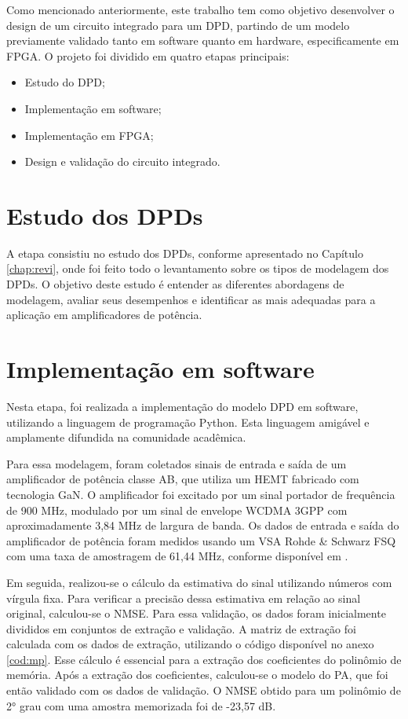 Como mencionado anteriormente, este trabalho tem como objetivo desenvolver o design de um circuito integrado para um DPD, partindo de um modelo previamente validado tanto em software quanto em hardware, especificamente em FPGA. O projeto foi dividido em quatro etapas principais:

\begin{itemize}
\item Estudo do DPD;
\item Implementação em software;
\item Implementação em FPGA;
\item Design e validação do circuito integrado.
\end{itemize}


\section{Estudo dos DPDs}
A etapa consistiu no estudo dos DPDs, conforme apresentado no Capítulo \ref{chap:revi}, onde foi feito todo o levantamento sobre os tipos de modelagem dos DPDs. O objetivo deste estudo é entender as diferentes abordagens de modelagem, avaliar seus desempenhos e identificar as mais adequadas para a aplicação em amplificadores de potência.

\section{Implementação em software} \label{sec:implsoft}

Nesta etapa, foi realizada a implementação do modelo DPD em software, utilizando a linguagem de programação Python. Esta linguagem amigável e amplamente difundida na comunidade acadêmica.

Para essa modelagem, foram coletados sinais de entrada e saída de um amplificador de potência classe AB, que utiliza um HEMT fabricado com tecnologia GaN. O amplificador foi excitado por um sinal portador de frequência de 900 MHz, modulado por um sinal de envelope WCDMA 3GPP com aproximadamente 3,84 MHz de largura de banda. Os dados de entrada e saída do amplificador de potência foram medidos usando um VSA Rohde \& Schwarz FSQ com uma taxa de amostragem de 61,44 MHz, conforme disponível em \cite{Bonfim2016}.

Em seguida, realizou-se o cálculo da estimativa do sinal utilizando números com vírgula fixa. Para verificar a precisão dessa estimativa em relação ao sinal original, calculou-se o NMSE. Para essa validação, os dados foram inicialmente divididos em conjuntos de extração e validação. A matriz de extração foi calculada com os dados de extração, utilizando o código disponível no anexo \ref{cod:mp}. Esse cálculo é essencial para a extração dos coeficientes do polinômio de memória. Após a extração dos coeficientes, calculou-se o modelo do PA, que foi então validado com os dados de validação. O NMSE obtido para um polinômio de 2° grau com uma amostra memorizada foi de -23,57 dB.

